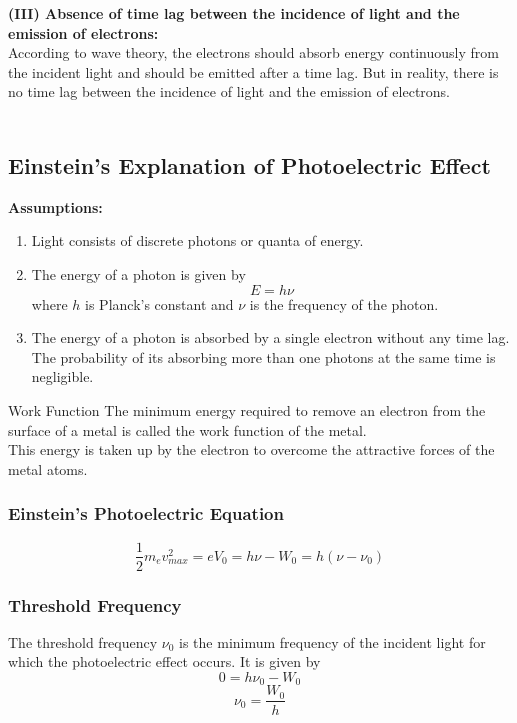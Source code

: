 \documentclass[12pt]{article}
\numberwithin{equation}{subsection}
\begin{document}
\textbf{(III) Absence of time lag between the incidence of light and the emission of electrons:} \\
According to wave theory, the electrons should absorb energy continuously from the incident light and should be emitted after a time lag. But in reality, there is no time lag between the incidence of light and the emission of electrons. \\~\\


\subsection{Einstein's Explanation of Photoelectric Effect}
\textbf{Assumptions:} \\
\begin{enumerate}
    \item Light consists of discrete photons or quanta of energy.
    \item The energy of a photon is given by \[
        E = h\nu
    \]
    where $h$ is Planck's constant and $\nu$ is the frequency of the photon.
    \item The energy of a photon is absorbed by a single electron without any time lag. The probability of its absorbing more than one photons at the same time is negligible.
\end{enumerate}

\begin{definition}{Work Function}{}
    The minimum energy required to remove an electron from the surface of a metal is called the work function of the metal. \\
    This energy is taken up by the electron to overcome the attractive forces of the metal atoms.
\end{definition}

\subsubsection{Einstein's Photoelectric Equation}
\begin{equation}
    \boxed{ \frac{1}{2}m_ev_{max}^2 = eV_0 = h\nu - W_0 = h(\nu - \nu_0) }
\end{equation}

\subsubsection{Threshold Frequency}
The threshold frequency $\nu_0$ is the minimum frequency of the incident light for which the photoelectric effect occurs. It is given by \[
    0 = h\nu_0 - W_0
\]
\begin{equation}
    \boxed{ \nu_0 = \frac{W_0}{h} }
\end{equation}
\end{document}
